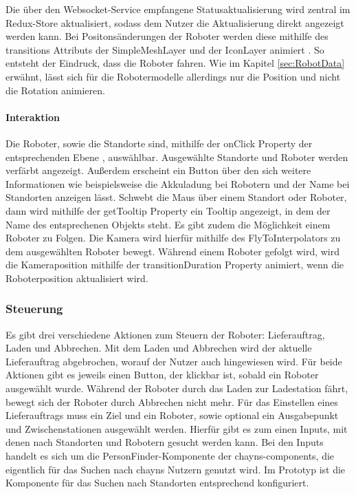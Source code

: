 Die über den \gls{Websocket}-Service empfangene Statusaktualisierung wird zentral im Redux-Store aktualisiert, sodass dem Nutzer die Aktualisierung direkt angezeigt werden kann. Bei Positonsänderungen der Roboter werden diese mithilfe des transitions Attributs der SimpleMeshLayer und der IconLayer animiert \cite{DeckglLayerClass}. So entsteht der Eindruck, dass die Roboter fahren. Wie im Kapitel \ref{sec:RobotData} erwähnt, lässt sich für die Robotermodelle allerdings nur die Position und nicht die Rotation animieren.

\paragraph{Interaktion}
Die Roboter, sowie die Standorte sind, mithilfe der onClick Property der entsprechenden Ebene \cite{DeckglInteractivity}, auswählbar. Ausgewählte Standorte und Roboter werden verfärbt angezeigt. Außerdem erscheint ein Button über den sich weitere Informationen wie beispielsweise die Akkuladung bei Robotern und der Name bei Standorten anzeigen lässt. Schwebt die Maus über einem Standort oder Roboter, dann wird mithilfe der getTooltip Property \cite{DeckglDeckClass} ein Tooltip angezeigt, in dem der Name des entsprechenen Objekts steht. Es gibt zudem die Möglichkeit einem Roboter zu Folgen. Die Kamera wird hierfür mithilfe des FlyToInterpolators \cite{DeckglFlyToInterpolator} zu dem ausgewählten Roboter bewegt. Während einem Roboter gefolgt wird, wird die Kameraposition mithilfe der transitionDuration Property \cite{DeckglAnimationsAndTransitions} animiert, wenn die Roboterposition aktualisiert wird.

\subsubsection{Steuerung}
Es gibt drei verschiedene Aktionen zum Steuern der Roboter: Lieferauftrag, Laden und Abbrechen. Mit dem Laden und Abbrechen wird der aktuelle Lieferauftrag abgebrochen, worauf der Nutzer auch hingewiesen wird. Für beide Aktionen gibt es jeweils einen Button, der klickbar ist, sobald ein Roboter ausgewählt wurde. Während der Roboter durch das Laden zur Ladestation fährt, bewegt sich der Roboter durch Abbrechen nicht mehr. Für das Einstellen eines Lieferauftrags muss ein Ziel und ein Roboter, sowie optional ein Ausgabepunkt und Zwischenstationen ausgewählt werden. Hierfür gibt es zum einen Inputs, mit denen nach Standorten und Robotern gesucht werden kann. Bei den Inputs handelt es sich um die PersonFinder-Komponente der chayns-components, die eigentlich für das Suchen nach chayns Nutzern genutzt wird. Im Prototyp ist die Komponente für das Suchen nach Standorten entsprechend konfiguriert.

